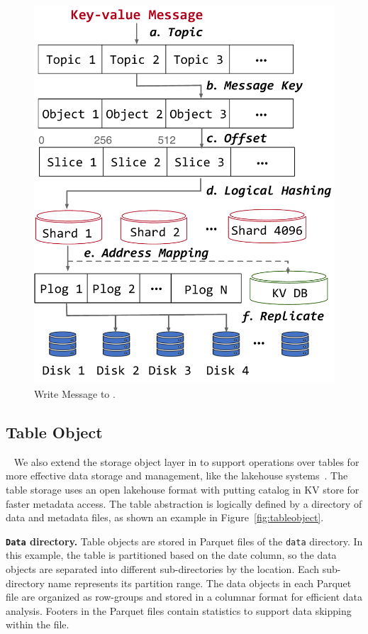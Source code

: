 \begin{figure}[htbp]	
	\includegraphics[scale=0.3]{figures/write}
	\centering
	\vspace{-1em}
	\caption{Write Message to \sys.}
	\label{fig:write}
	\vspace{-2em}
\end{figure}


\subsection{Table Object}~\label{subsec:tableobject}
We also extend the storage object layer in \sys to support operations over tables for more effective data storage and management, like the lakehouse systems~\cite{iceberg,hudi,delta}. The table storage uses an open lakehouse format with putting catalog in KV store  for faster metadata access. The table abstraction is logically defined by a directory of data and metadata files, as shown an example  in Figure~\ref{fig:tableobject}.

\noindent \textbf{\texttt{Data} directory.} Table objects are stored in Parquet files of the \texttt{data} directory. In this example, the table is partitioned based on the date column, so the data objects are separated into different sub-directories by the location. Each sub-directory name represents its partition range. The data objects in each Parquet file are organized as row-groups and stored in a columnar format for efficient data analysis. Footers in the Parquet files contain statistics to support data skipping within the file.




